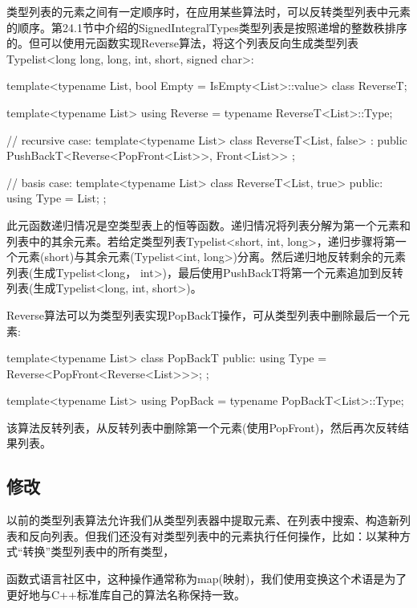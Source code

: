 类型列表的元素之间有一定顺序时，在应用某些算法时，可以反转类型列表中元素的顺序。第24.1节中介绍的SignedIntegralTypes类型列表是按照递增的整数秩排序的。但可以使用元函数实现Reverse算法，将这个列表反向生成类型列表Typelist<long long, long, int, short, signed char>:

\begin{cpp}
template<typename List, bool Empty = IsEmpty<List>::value>
class ReverseT;

template<typename List>
using Reverse = typename ReverseT<List>::Type;

// recursive case:
template<typename List>
class ReverseT<List, false>
: public PushBackT<Reverse<PopFront<List>>, Front<List>> { };

// basis case:
template<typename List>
class ReverseT<List, true>
{
	public:
	using Type = List;
};
\end{cpp}

此元函数递归情况是空类型表上的恒等函数。递归情况将列表分解为第一个元素和列表中的其余元素。若给定类型列表Typelist<short, int, long>，递归步骤将第一个元素(short)与其余元素(Typelist<int, long>)分离。然后递归地反转剩余的元素列表(生成Typelist<long， int>)，最后使用PushBackT将第一个元素追加到反转列表(生成Typelist<long, int, short>)。

Reverse算法可以为类型列表实现PopBackT操作，可从类型列表中删除最后一个元素:

\begin{cpp}
template<typename List>
class PopBackT {
	public:
	using Type = Reverse<PopFront<Reverse<List>>>;
};

template<typename List>
using PopBack = typename PopBackT<List>::Type;
\end{cpp}

该算法反转列表，从反转列表中删除第一个元素(使用PopFront)，然后再次反转结果列表。

\subsection{修改}

以前的类型列表算法允许我们从类型列表器中提取元素、在列表中搜索、构造新列表和反向列表。但我们还没有对类型列表中的元素执行任何操作，比如：以某种方式“转换”类型列表中的所有类型，

\begin{notice}
函数式语言社区中，这种操作通常称为map(映射)，我们使用变换这个术语是为了更好地与C++标准库自己的算法名称保持一致。
\end{notice}

